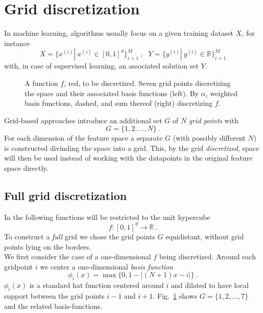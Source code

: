 \section{Grid discretization}\label{sec:grid}

In machine learning, algorithms usually focus on a given training dataset
$X$, for instance
$$ X = \{x^{(i)} | \ x^{(i)} \in [0, 1]^d\}_{i = 1}^M \ , \ \ \
Y = \{y^{(i)} | \ y^{(i)} \in \mathbb{R}\}_{i=1}^M$$
with, in case of supervised learning, an associated solution set $Y$.

\par

\begin{figure}[t!]
  \centering
  
  \caption{A function $f$, red, to be discretized.
    Seven grid points discretizing the space and their associated basis functions
  (left). By $\alpha_i$ weighted basis functions, dashed, and sum thereof (right)
  discretizing $f$.\label{fig:fig1}}
\end{figure}

Grid-based approaches introduce an additional set $G$ of $N$
\emph{grid points} with
$$ G = \{1,2,\dots,N\} \ .$$
For each dimension of the feature space a separate $G$ (with possibly
different $N$) is constructed divinding the space into a grid.
This, by the grid \emph{discretized}, space
will then be used instead of working with the datapoints in the original
feature space directly.

\subsection{Full grid discretization}\label{subsec:fullgrid}
In the following functions
will be restricted to the unit hypercube
 $$ f: [0, 1]^d \rightarrow \mathbb{R} \ .$$
To construct a \emph{full} grid we chose the grid points $G$ equidistant,
without grid points lying on the borders. \\
We first consider the case of a one-dimensional $f$ being discretized.
Around each gridpoint $i$ we center a one-dimensional
\emph{basis function}
$$ \phi_i(x) = \max\{0, 1 - |(N + 1)x - i|\} \ .$$
$\phi_i(x)$ is a standard hat function centered around $i$ and dilated
to have local support between the grid points $i - 1$ and $i + 1$. Fig.~\ref{fig:fig1}
shows $G = \{1,2,\dots,7\}$ and the related basis-functions.

